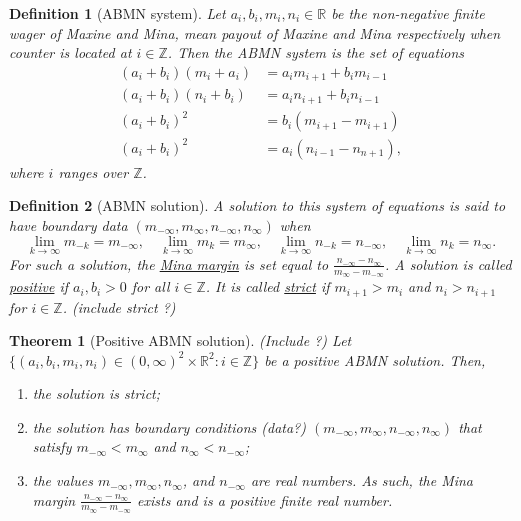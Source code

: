 \documentclass{article}
\newtheorem{theorem}{Theorem}
\newtheorem{definition}{Definition}
\begin{document}
\begin{definition}[ABMN system]
    Let $a_i, b_i, m_i, n_i \in\mathbb{R}$ be the non-negative finite wager of Maxine and Mina, mean
    payout of Maxine and Mina respectively when counter is located at $i\in\mathbb{Z}$. Then the
    ABMN system is the set of equations 
    \begin{align}
        (a_i + b_i)(m_i + a_i) & = a_i m_{i+1} + b_i m_{i-1} \\
        (a_i + b_i)(n_i + b_i) & = a_i n_{i+1} + b_i n_{i-1} \\
        (a_i + b_i)^2 & = b_i (m_{i+1} - m_{i+1}) \\
        (a_i + b_i)^2 & = a_i (n_{i-1} - n_{n+1}),
    \end{align}
    where $i$ ranges over $\mathbb{Z}$. 
\end{definition}

\begin{definition}[ABMN solution]
    A solution to this system of equations is said to have boundary data $(m_{-\infty}, m_{\infty},
    n_{-\infty}, n_{\infty})$ when 
    $$\lim_{k\to\infty}m_{-k}=m_{-\infty}, \quad \lim_{k\to\infty}m_{k}=m_{\infty}, \quad
    \lim_{k\to\infty}n_{-k}=n_{-\infty}, \quad \lim_{k\to\infty}n_{k}=n_{\infty}.$$ For such a
    solution, the \underline{Mina margin} is set equal to
    $\frac{n_{-\infty}-n_{\infty}}{m_{\infty}-m_{-\infty}}$. A solution is called
    \underline{positive} if $a_i, b_i >0$ for all $i\in\mathbb{Z}$. It is called \underline{strict}
    if $m_{i+1}>m_i$ and $n_i>n_{i+1}$ for $i\in\mathbb{Z}$. (include strict ?)
\end{definition}

\begin{theorem}[Positive ABMN solution] (Include ?)
    Let $\{(a_i, b_i, m_i, n_i)\in(0,\infty)^2\times\mathbb{R}^2:i\in\mathbb{Z}\}$ be a positive
    ABMN solution. Then,
    \begin{enumerate}
        \item the solution is strict;
        \item the solution has boundary conditions (data?) $(m_{-\infty}, m_{\infty}, n_{-\infty},
        n_{\infty})$ that satisfy $m_{-\infty}<m_{\infty}$ and $n_{\infty} < n_{-\infty}$;
        \item the values $m_{-\infty},m_{\infty},n_{\infty}$, and $n_{-\infty}$ are real numbers. As
        such, the Mina margin $\frac{n_{-\infty}-n_{\infty}}{m_{\infty}-m_{-\infty}}$ exists and is
        a positive finite real number.
    \end{enumerate}
\end{theorem}
\end{document}
